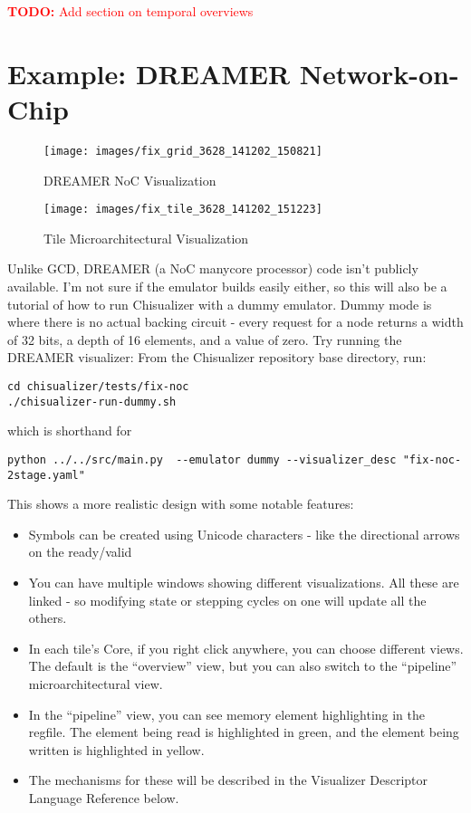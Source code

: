\documentclass[11pt]{article}
\newcommand{\todo}[1]{\textcolor{red}{\textbf{TODO:} #1}}
\begin{document}
\todo{Add section on temporal overviews}

\section{Example: DREAMER Network-on-Chip}
\label{sec:example_dreamer}
\begin{figure}[h!]
  \centering
    \texttt{[image: images/fix\_grid\_3628\_141202\_150821]}
  \caption{DREAMER NoC Visualization}
\end{figure}

\begin{figure}[h!]
  \centering
    \texttt{[image: images/fix\_tile\_3628\_141202\_151223]}
  \caption{Tile Microarchitectural Visualization}
\end{figure}

Unlike GCD, DREAMER (a NoC manycore processor) code isn't publicly available. I'm not sure if the emulator builds easily either, so this will also be a tutorial of how to run Chisualizer with a dummy emulator. Dummy mode is where there is no actual backing circuit - every request for a node returns a width of 32 bits, a depth of 16 elements, and a value of zero. Try running the DREAMER visualizer:
From the Chisualizer repository base directory, run:
\begin{verbatim}
cd chisualizer/tests/fix-noc
./chisualizer-run-dummy.sh
\end{verbatim}

which is shorthand for

\begin{verbatim}
python ../../src/main.py  --emulator dummy --visualizer_desc "fix-noc-2stage.yaml"
\end{verbatim}

This shows a more realistic design with some notable features:
\begin{itemize}
  \item Symbols can be created using Unicode characters - like the directional arrows on the ready/valid
  \item You can have multiple windows showing different visualizations. All these are linked - so modifying state or stepping cycles on one will update all the others.
  \item In each tile's Core, if you right click anywhere, you can choose different views. The default is the ``overview'' view, but you can also switch to the ``pipeline'' microarchitectural view.
  \item In the ``pipeline'' view, you can see memory element highlighting in the regfile. The element being read is highlighted in green, and the element being written is highlighted in yellow.
  \item The mechanisms for these will be described in the Visualizer Descriptor Language Reference below.
\end{itemize}
\end{document}
